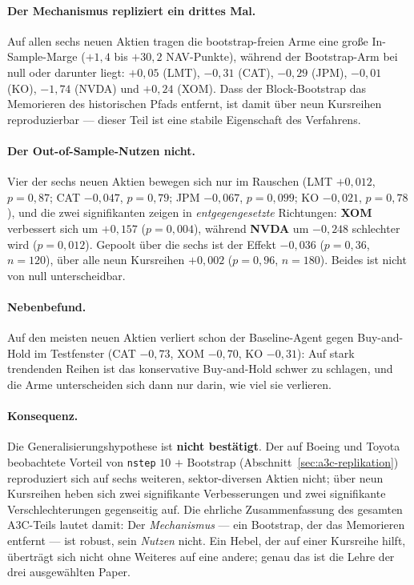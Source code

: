 \paragraph{Der Mechanismus repliziert ein drittes Mal.} Auf allen sechs neuen Aktien tragen
die bootstrap-freien Arme eine große In-Sample-Marge ($+1{,}4$ bis $+30{,}2$ NAV-Punkte),
während der Bootstrap-Arm bei null oder darunter liegt: $+0{,}05$ (LMT), $-0{,}31$ (CAT),
$-0{,}29$ (JPM), $-0{,}01$ (KO), $-1{,}74$ (NVDA) und $+0{,}24$ (XOM). Dass der
Block-Bootstrap das Memorieren des historischen Pfads entfernt, ist damit über neun
Kursreihen reproduzierbar --- dieser Teil ist eine stabile Eigenschaft des Verfahrens.

\paragraph{Der Out-of-Sample-Nutzen nicht.} Vier der sechs neuen Aktien bewegen sich nur im
Rauschen (LMT $+0{,}012$, $p=0{,}87$; CAT $-0{,}047$, $p=0{,}79$; JPM $-0{,}067$,
$p=0{,}099$; KO $-0{,}021$, $p=0{,}78$), und die zwei signifikanten zeigen in
\emph{entgegengesetzte} Richtungen: \textbf{XOM} verbessert sich um $+0{,}157$
($p=0{,}004$), während \textbf{NVDA} um $-0{,}248$ schlechter wird ($p=0{,}012$). Gepoolt
über die sechs ist der Effekt $-0{,}036$ ($p=0{,}36$, $n=120$), über alle neun Kursreihen
$+0{,}002$ ($p=0{,}96$, $n=180$). Beides ist nicht von null unterscheidbar.

\paragraph{Nebenbefund.} Auf den meisten neuen Aktien verliert schon der Baseline-Agent
gegen Buy-and-Hold im Testfenster (CAT $-0{,}73$, XOM $-0{,}70$, KO $-0{,}31$): Auf stark
trendenden Reihen ist das konservative Buy-and-Hold schwer zu schlagen, und die Arme
unterscheiden sich dann nur darin, wie viel sie verlieren.

\paragraph{Konsequenz.} Die Generalisierungshypothese ist \textbf{nicht bestätigt}. Der auf
Boeing und Toyota beobachtete Vorteil von \texttt{nstep} $10$ $+$ Bootstrap
(Abschnitt~\ref{sec:a3c-replikation}) reproduziert sich auf sechs weiteren,
sektor-diversen Aktien nicht; über neun Kursreihen heben sich zwei signifikante
Verbesserungen und zwei signifikante Verschlechterungen gegenseitig auf. Die ehrliche
Zusammenfassung des gesamten A3C-Teils lautet damit: Der \emph{Mechanismus} --- ein
Bootstrap, der das Memorieren entfernt --- ist robust, sein \emph{Nutzen} nicht. Ein Hebel,
der auf einer Kursreihe hilft, überträgt sich nicht ohne Weiteres auf eine andere; genau das
ist die Lehre der drei ausgewählten Paper.

